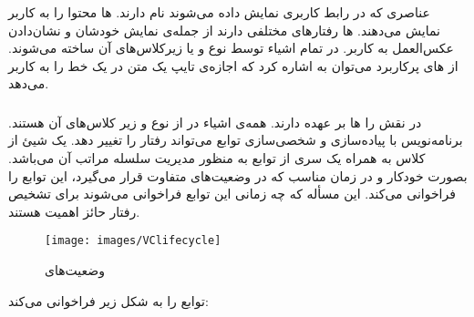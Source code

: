 \documentclass[oneside]{report}
\begin{document}
\subsubsection{{\small {}}}
عناصری که در رابط کاربری نمایش داده می‌شوند 
  {\normalsize {}} 
  نام دارند. 
    {\normalsize {}} ها 
    محتوا را به کاربر نمایش می‌دهند.
      {\normalsize {}} 
      ها رفتارهای مختلفی دارند از جمله‌ی نمایش خودشان و نشان‌دادن عکس‌العمل به کاربر. 
در 
  {\normalsize {}} 
  تمام اشیاء 
    {\normalsize {}} 
    توسط نوع 
      {\normalsize {}} 
       و یا زیرکلاس‌های آن ساخته می‌شوند. از 
         {\normalsize {}}  های
   پرکاربرد می‌توان به 
     {\normalsize {}} 
     اشاره کرد که اجازه‌ی تایپ یک متن در یک خط را به کاربر می‌دهد.

\subsubsection{{\small {}}}
 در 
   {\normalsize {}}
  نقش 
    {\normalsize {}} 
    را 
     {\normalsize {}} ها
     بر عهده دارند. همه‌ی اشیاء 
       {\normalsize {}}  
در 
  {\normalsize {}}
  از نوع 
      {\normalsize {}}
  و زیر کلاس‌های آن هستند. 
  برنامه‌نویس با پیاده‌سازی و شخصی‌سازی توابع 
         {\normalsize {}}  
   می‌تواند رفتار 
          {\normalsize {}}  
          را تغییر دهد.       
    یک شیئ از کلاس
    {\normalsize {}}
     به همراه یک سری از توابع به منظور مدیریت سلسله مراتب 
     {\normalsize {}} ‌
     آن می‌باشد. 
     {\normalsize {}}
     بصورت خودکار و در زمان مناسب که 
     {\normalsize {}} 
     در وضعیت‌های متفاوت قرار می‌گیرد،
     این توابع را فراخوانی می‌کند.  
     این مسأله که چه زمانی این توابع فراخوانی می‌شوند برای تشخیص رفتار 
     {\normalsize {}} 
     حائز اهمیت هستند. 
	\begin{figure}[h]
		\centering
		\texttt{[image: images/VClifecycle]}
		\caption{وضعیت‌های {\footnotesize {}} }
		\label{fig:vclifecycle}
	\end{figure}
	{\normalsize {}} 
توابع را به شکل زیر فراخوانی می‌کند: 
\end{document}
